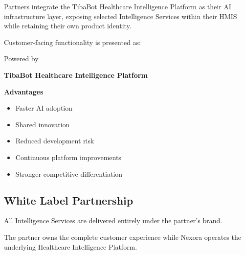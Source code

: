 \begin{partnerbox}

Partners integrate the TibaBot Healthcare Intelligence Platform as their AI infrastructure layer, exposing selected Intelligence Services within their HMIS while retaining their own product identity.

Customer-facing functionality is presented as:

\vspace{4mm}

\begin{center}

\Large

Powered by

\vspace{2mm}

\textbf{TibaBot Healthcare Intelligence Platform}

\end{center}

\vspace{4mm}

\textbf{Advantages}

\begin{itemize}

\item Faster AI adoption

\item Shared innovation

\item Reduced development risk

\item Continuous platform improvements

\item Stronger competitive differentiation

\end{itemize}

\end{partnerbox}


\subsection{White Label Partnership}

\begin{partnerbox}

All Intelligence Services are delivered entirely under the partner's brand.

The partner owns the complete customer experience while Nexora operates the underlying Healthcare Intelligence Platform.

\end{partnerbox}

